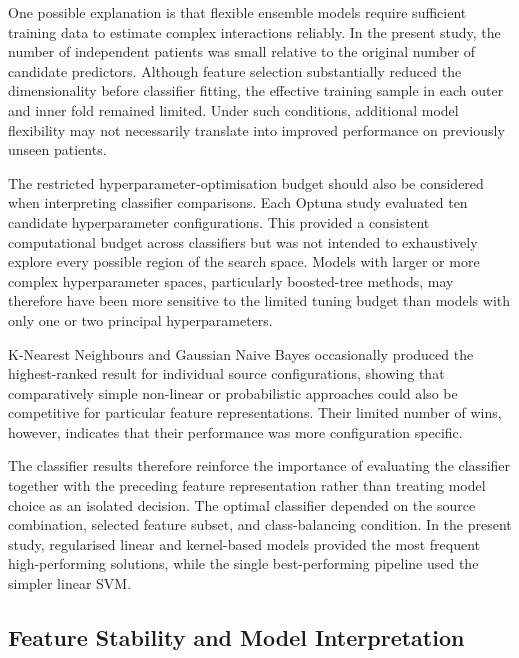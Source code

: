 \documentclass[12pt,twocolumn]{article}
\begin{document}
One possible explanation is that flexible ensemble models require
sufficient training data to estimate complex interactions reliably.
In the present study, the number of independent patients was small
relative to the original number of candidate predictors. Although
feature selection substantially reduced the dimensionality before
classifier fitting, the effective training sample in each outer and
inner fold remained limited. Under such conditions, additional model
flexibility may not necessarily translate into improved performance
on previously unseen patients.

The restricted hyperparameter-optimisation budget should also be
considered when interpreting classifier comparisons. Each Optuna
study evaluated ten candidate hyperparameter configurations. This
provided a consistent computational budget across classifiers but was
not intended to exhaustively explore every possible region of the
search space. Models with larger or more complex hyperparameter
spaces, particularly boosted-tree methods, may therefore have been
more sensitive to the limited tuning budget than models with only one
or two principal hyperparameters.

K-Nearest Neighbours and Gaussian Naive Bayes occasionally produced
the highest-ranked result for individual source configurations,
showing that comparatively simple non-linear or probabilistic
approaches could also be competitive for particular feature
representations. Their limited number of wins, however, indicates
that their performance was more configuration specific.

The classifier results therefore reinforce the importance of
evaluating the classifier together with the preceding feature
representation rather than treating model choice as an isolated
decision. The optimal classifier depended on the source combination,
selected feature subset, and class-balancing condition. In the present
study, regularised linear and kernel-based models provided the most
frequent high-performing solutions, while the single best-performing
pipeline used the simpler linear SVM.














\subsection{Feature Stability and Model Interpretation}
\label{subsec:discussion_interpretability}
\end{document}
